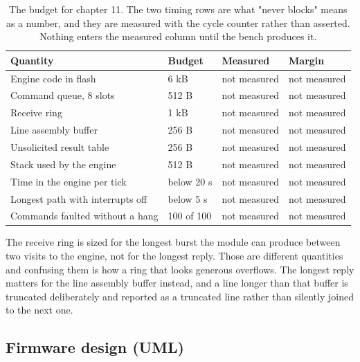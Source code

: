 \begin{table}[H]\centering\small
\begin{tabular}{p{44mm}p{28mm}p{28mm}p{30mm}}
\toprule
Quantity & Budget & Measured & Margin \\
\midrule
Engine code in flash & 6 kB & not measured & not measured \\
Command queue, 8 slots & 512 B & not measured & not measured \\
Receive ring & 1 kB & not measured & not measured \\
Line assembly buffer & 256 B & not measured & not measured \\
Unsolicited result table & 256 B & not measured & not measured \\
Stack used by the engine & 512 B & not measured & not measured \\
Time in the engine per tick & below 20 \textmu{}s & not measured & not measured \\
Longest path with interrupts off & below 5 \textmu{}s & not measured & not measured \\
Commands faulted without a hang & 100 of 100 & not measured & not measured \\
\bottomrule
\end{tabular}
\caption{The budget for chapter 11. The two timing rows are what "never blocks" means as a number, and they are measured with the cycle counter rather than asserted. Nothing enters the measured column until the bench produces it.}
\end{table}

The receive ring is sized for the longest burst the module can produce between
two visits to the engine, not for the longest reply. Those are different
quantities and confusing them is how a ring that looks generous overflows. The
longest reply matters for the line assembly buffer instead, and a line longer
than that buffer is truncated deliberately and reported as a truncated line
rather than silently joined to the next one.

\subsection*{Firmware design (UML)}


